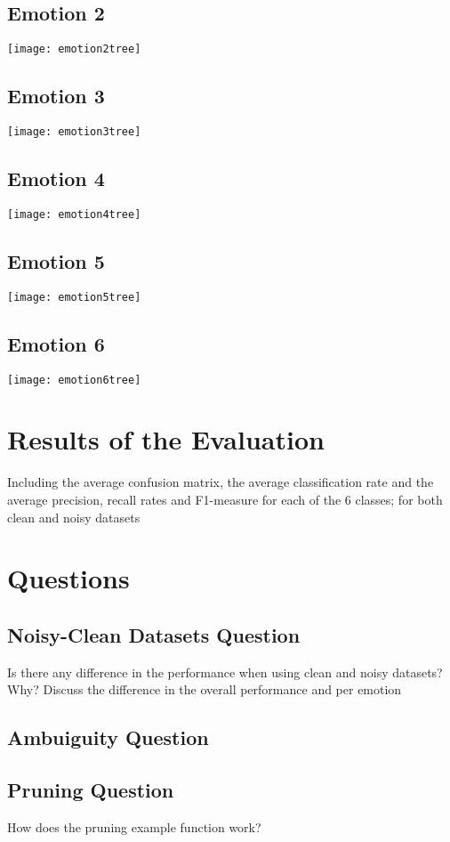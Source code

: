 \documentclass[a4paper,11pt]{article}
\begin{document}
\subsection{Emotion 2}

\texttt{[image: emotion2tree]}

\subsection{Emotion 3}

\texttt{[image: emotion3tree]}

\subsection{Emotion 4}

\texttt{[image: emotion4tree]}

\subsection{Emotion 5}

\texttt{[image: emotion5tree]}

\subsection{Emotion 6}

\texttt{[image: emotion6tree]}

\section{Results of the Evaluation}

Including the average confusion matrix, the average classification rate and the average precision, recall rates and F1-measure for each of the 6 classes; for both clean and noisy datasets

\section{Questions}

\subsection{Noisy-Clean Datasets Question}

Is there any difference in the performance when using clean and noisy datasets? Why?
Discuss the difference in the overall performance and per emotion

\subsection{Ambuiguity Question}



\subsection{Pruning Question}

How does the pruning example function work? 



\end{document}
